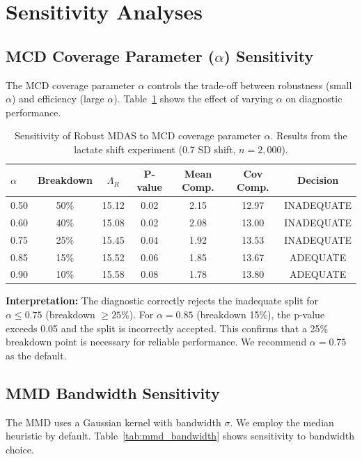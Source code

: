 \documentclass[10pt,a4paper]{article}
\begin{document}
\section{Sensitivity Analyses}

\subsection{MCD Coverage Parameter ($\alpha$) Sensitivity}

The MCD coverage parameter $\alpha$ controls the trade-off between robustness (small $\alpha$) and efficiency (large $\alpha$). Table~\ref{tab:mcd_alpha} shows the effect of varying $\alpha$ on diagnostic performance.

\begin{table}[H]
\centering
\caption{Sensitivity of Robust MDAS to MCD coverage parameter $\alpha$. Results from the lactate shift experiment (0.7 SD shift, $n = 2,000$).}
\label{tab:mcd_alpha}
\begin{tabular}{lcccccc}
\toprule
$\alpha$ & Breakdown & $\Lambda_R$ & P-value & Mean Comp. & Cov Comp. & Decision \\
\midrule
0.50 & 50\% & 15.12 & 0.02 & 2.15 & 12.97 & INADEQUATE \\
0.60 & 40\% & 15.08 & 0.02 & 2.08 & 13.00 & INADEQUATE \\
0.75 & 25\% & 15.45 & 0.04 & 1.92 & 13.53 & INADEQUATE \\
0.85 & 15\% & 15.52 & 0.06 & 1.85 & 13.67 & ADEQUATE \\
0.90 & 10\% & 15.58 & 0.08 & 1.78 & 13.80 & ADEQUATE \\
\bottomrule
\end{tabular}
\end{table}

\textbf{Interpretation:} The diagnostic correctly rejects the inadequate split for $\alpha \leq 0.75$ (breakdown $\geq 25\%$). For $\alpha = 0.85$ (breakdown 15\%), the p-value exceeds 0.05 and the split is incorrectly accepted. This confirms that a 25\% breakdown point is necessary for reliable performance. We recommend $\alpha = 0.75$ as the default.

\subsection{MMD Bandwidth Sensitivity}

The MMD uses a Gaussian kernel with bandwidth $\sigma$. We employ the median heuristic by default. Table~\ref{tab:mmd_bandwidth} shows sensitivity to bandwidth choice.
\end{document}
